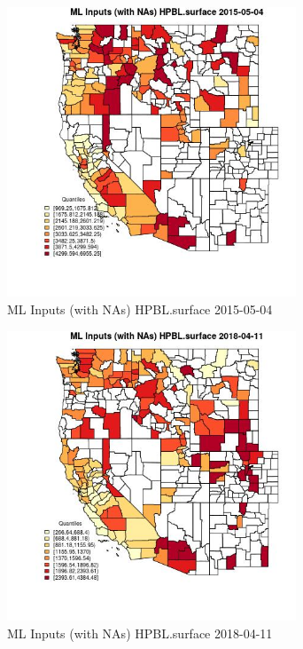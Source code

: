 \begin{figure} 
\centering  
\includegraphics[width=0.77\textwidth]{Code_Outputs/Report_ML_input_PM25_Step4_part_e_de_duplicated_aves_compiled_2019-05-18wNAs_CountyHPBLsurfaceMean2015-05-04_2015-05-04.jpg} 
\caption{\label{fig:Report_ML_input_PM25_Step4_part_e_de_duplicated_aves_compiled_2019-05-18wNAsCountyHPBLsurfaceMean2015-05-04_2015-05-04}ML Inputs (with NAs) HPBL.surface 2015-05-04} 
\end{figure} 
 

\begin{figure} 
\centering  
\includegraphics[width=0.77\textwidth]{Code_Outputs/Report_ML_input_PM25_Step4_part_e_de_duplicated_aves_compiled_2019-05-18wNAs_CountyHPBLsurfaceMean2018-04-11_2018-04-11.jpg} 
\caption{\label{fig:Report_ML_input_PM25_Step4_part_e_de_duplicated_aves_compiled_2019-05-18wNAsCountyHPBLsurfaceMean2018-04-11_2018-04-11}ML Inputs (with NAs) HPBL.surface 2018-04-11} 
\end{figure} 
 

